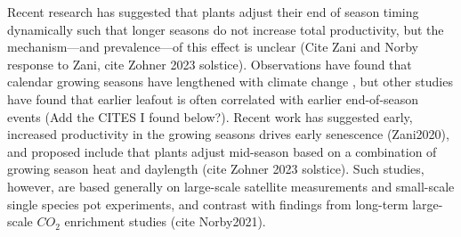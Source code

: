 \documentclass[12 pt]{article}
\begin{document}
Recent research has suggested that plants adjust their end of season timing dynamically such that longer seasons do not increase total productivity, but the mechanism---and prevalence---of this effect is unclear (Cite Zani and Norby response to Zani, cite Zohner 2023 solstice). Observations have found that calendar growing seasons have lengthened with climate change \citep{}, but other studies have found that earlier leafout is often correlated with earlier end-of-season events (Add the CITES I found below?). Recent work has suggested early, increased productivity in the growing seasons drives early senescence (Zani2020), and proposed include that plants adjust mid-season based on a combination of growing season heat and daylength (cite Zohner 2023 solstice). Such studies, however, are based generally on large-scale satellite measurements and small-scale single species pot experiments, and contrast with findings from long-term large-scale $CO_2$ enrichment studies (cite Norby2021). 
\end{document}
